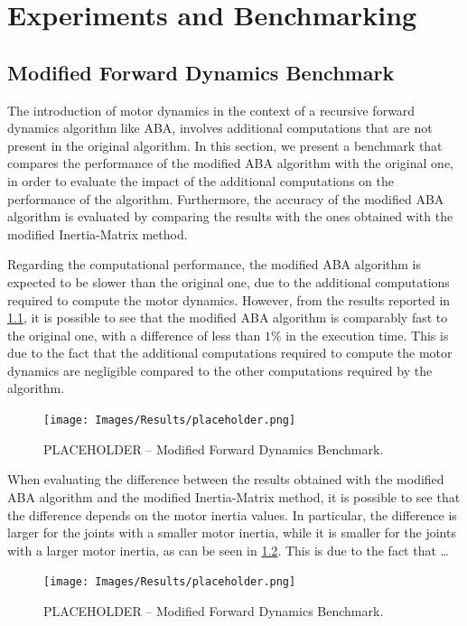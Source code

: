 \chapter{Experiments and Benchmarking}
\label{chp:contrib_ResultsDiscussion}

\section{Modified Forward Dynamics Benchmark}

The introduction of motor dynamics in the context of a recursive forward dynamics algorithm like \ac{ABA}, involves additional computations that are not present in the original algorithm. In this section, we present a benchmark that compares the performance of the modified \ac{ABA} algorithm with the original one, in order to evaluate the impact of the additional computations on the performance of the algorithm. Furthermore, the accuracy of the modified \ac{ABA} algorithm is evaluated by comparing the results with the ones obtained with the modified Inertia-Matrix method.

Regarding the computational performance, the modified \ac{ABA} algorithm is expected to be slower than the original one, due to the additional computations required to compute the motor dynamics. However, from the results reported in \cref{fig:fd_benchmark}, it is possible to see that the modified \ac{ABA} algorithm is comparably fast to the original one, with a difference of less than $1\%$ in the execution time. This is due to the fact that the additional computations required to compute the motor dynamics are negligible compared to the other computations required by the algorithm.

\begin{figure}
    \centering
    \caption{PLACEHOLDER -- Modified Forward Dynamics Benchmark.}
    \label{fig:fd_benchmark}
    \texttt{[image: Images/Results/placeholder.png]}
\end{figure}

When evaluating the difference between the results obtained with the modified \ac{ABA} algorithm and the modified Inertia-Matrix method, it is possible to see that the difference depends on the motor inertia values. In particular, the difference is larger for the joints with a smaller motor inertia, while it is smaller for the joints with a larger motor inertia, as can be seen in \cref{fig:fd_comparison}. This is due to the fact that \dots

\begin{figure}
    \centering
    \caption{PLACEHOLDER -- Modified Forward Dynamics Benchmark.}
    \label{fig:fd_comparison}
    \texttt{[image: Images/Results/placeholder.png]}
\end{figure}

